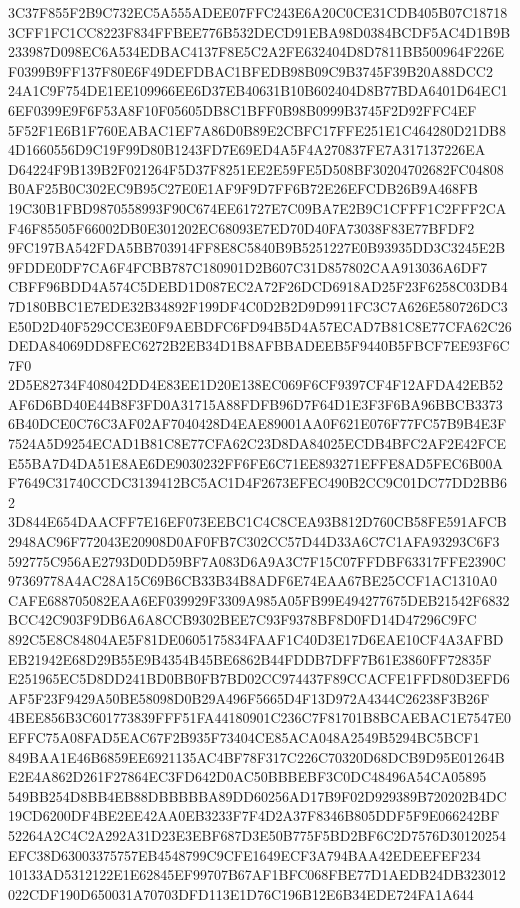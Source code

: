 \documentclass[UTF8,fontset=fandol,zihao=-4,a4paper]{ctexart}
\begin{document}
{{3C37F855F2B9C732EC5A555ADEE07FFC243E6A20C0CE31CDB405B07C187183CFF1FC1CC8223F834FFBEE776B532DECD91EBA98D0384BCDF5AC4D1B9B
233987D098EC6A534EDBAC4137F8E5C2A2FE632404D8D7811BB500964F226EF0399B9FF137F80E6F49DEFDBAC1BFEDB98B09C9B3745F39B20A88DCC2
24A1C9F754DE1EE109966EE6D37EB40631B10B602404D8B77BDA6401D64EC16EF0399E9F6F53A8F10F05605DB8C1BFF0B98B0999B3745F2D92FFC4EF
5F52F1E6B1F760EABAC1EF7A86D0B89E2CBFC17FFE251E1C464280D21DB84D1660556D9C19F99D80B1243FD7E69ED4A5F4A270837FE7A317137226EA
D64224F9B139B2F021264F5D37F8251EE2E59FE5D508BF30204702682FC04808B0AF25B0C302EC9B95C27E0E1AF9F9D7FF6B72E26EFCDB26B9A468FB
19C30B1FBD9870558993F90C674EE61727E7C09BA7E2B9C1CFFF1C2FFF2CAF46F85505F66002DB0E301202EC68093E7ED70D40FA73038F83E77BFDF2
9FC197BA542FDA5BB703914FF8E8C5840B9B5251227E0B93935DD3C3245E2B9FDDE0DF7CA6F4FCBB787C180901D2B607C31D857802CAA913036A6DF7
CBFF96BDD4A574C5DEBD1D087EC2A72F26DCD6918AD25F23F6258C03DB47D180BBC1E7EDE32B34892F199DF4C0D2B2D9D9911FC3C7A626E580726DC3
E50D2D40F529CCE3E0F9AEBDFC6FD94B5D4A57ECAD7B81C8E77CFA62C26DEDA84069DD8FEC6272B2EB34D1B8AFBBADEEB5F9440B5FBCF7EE93F6C7F0
2D5E82734F408042DD4E83EE1D20E138EC069F6CF9397CF4F12AFDA42EB52AF6D6BD40E44B8F3FD0A31715A88FDFB96D7F64D1E3F3F6BA96BBCB3373
6B40DCE0C76C3AF02AF7040428D4EAE89001AA0F621E076F77FC57B9B4E3F7524A5D9254ECAD1B81C8E77CFA62C23D8DA84025ECDB4BFC2AF2E42FCE
E55BA7D4DA51E8AE6DE9030232FF6FE6C71EE893271EFFE8AD5FEC6B00AF7649C31740CCDC3139412BC5AC1D4F2673EFEC490B2CC9C01DC77DD2BB62
3D844E654DAACFF7E16EF073EEBC1C4C8CEA93B812D760CB58FE591AFCB2948AC96F772043E20908D0AF0FB7C302CC57D44D33A6C7C1AFA93293C6F3
592775C956AE2793D0DD59BF7A083D6A9A3C7F15C07FFDBF63317FFE2390C97369778A4AC28A15C69B6CB33B34B8ADF6E74EAA67BE25CCF1AC1310A0
CAFE688705082EAA6EF039929F3309A985A05FB99E494277675DEB21542F6832BCC42C903F9DB6A6A8CCB9302BEE7C93F9378BF8D0FD14D47296C9FC
892C5E8C84804AE5F81DE0605175834FAAF1C40D3E17D6EAE10CF4A3AFBDEB21942E68D29B55E9B4354B45BE6862B44FDDB7DFF7B61E3860FF72835F
E251965EC5D8DD241BD0BB0FB7BD02CC974437F89CCACFE1FFD80D3EFD6AF5F23F9429A50BE58098D0B29A496F5665D4F13D972A4344C26238F3B26F
4BEE856B3C601773839FFF51FA44180901C236C7F81701B8BCAEBAC1E7547E0EFFC75A08FAD5EAC67F2B935F73404CE85ACA048A2549B5294BC5BCF1
849BAA1E46B6859EE6921135AC4BF78F317C226C70320D68DCB9D95E01264BE2E4A862D261F27864EC3FD642D0AC50BBBEBF3C0DC48496A54CA05895
549BB254D8BB4EB88DBBBBBA89DD60256AD17B9F02D929389B720202B4DC19CD6200DF4BE2EE42AA0EB3233F7F4D2A37F8346B805DDF5F9E066242BF
52264A2C4C2A292A31D23E3EBF687D3E50B775F5BD2BF6C2D7576D30120254EFC38D63003375757EB4548799C9CFE1649ECF3A794BAA42EDEEFEF234
10133AD5312122E1E62845EF99707B67AF1BFC068FBE77D1AEDB24DB323012022CDF190D650031A70703DFD113E1D76C196B12E6B34EDE724FA1A644
}}
\end{document}
